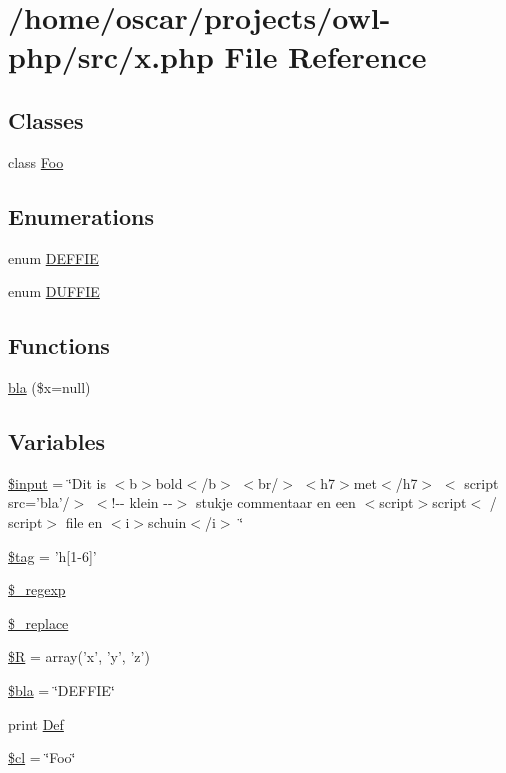 \section{/home/oscar/projects/owl-\/php/src/x.php File Reference}
\label{x_8php}
\subsection*{Classes}
\begin{DoxyCompactItemize}
\item 
class \hyperlink{classFoo}{Foo}
\end{DoxyCompactItemize}
\subsection*{Enumerations}
\begin{DoxyCompactItemize}
\item 
enum \hyperlink{x_8php_a22a59822f87564f3e66e3f14ac2c62f7}{DEFFIE} 
\item 
enum \hyperlink{x_8php_ad4f22af99a23392da6dce10ee148488d}{DUFFIE} 
\end{DoxyCompactItemize}
\subsection*{Functions}
\begin{DoxyCompactItemize}
\item 
\hyperlink{x_8php_ab6cdfa5a880b1653d91c3be35ccb5218}{bla} (\$x=null)
\end{DoxyCompactItemize}
\subsection*{Variables}
\begin{DoxyCompactItemize}
\item 
\hyperlink{x_8php_a69b271260be394b90709736cccb22c76}{\$input} = \char`\"{}Dit is $<$b$>$bold$<$/b$>$ $<$br/$>$ $<$h7$>$met$<$/h7$>$ $<$ script src='bla'/$>$ $<$!-\/-\/ klein -\/-\/$>$ stukje commentaar en een $<$script$>$script$<$ / script$>$ file en $<$i$>$schuin$<$/i$>$ \char`\"{}
\item 
\hyperlink{x_8php_a81d5015d41ed8ec66e9db8cdc5db9555}{\$tag} = 'h\mbox{[}1-\/6\mbox{]}'
\item 
\hyperlink{x_8php_aeb01ec713159369dbfafe73aabc23305}{\$\_\-regexp}
\item 
\hyperlink{x_8php_aeca86c76fb2260c4968ed2585230a067}{\$\_\-replace}
\item 
\hyperlink{x_8php_abe2d79bb4aa8b8243d81c67fdd50511f}{\$R} = array('x', 'y', 'z')
\item 
\hyperlink{x_8php_ac56f43e5df52bc5b57812bf5df15a8c2}{\$bla} = \char`\"{}DEFFIE\char`\"{}
\item 
print \hyperlink{x_8php_ab7ad2ab6d32f70132de3de13d200e0a3}{Def}
\item 
\hyperlink{x_8php_ac2cc45201ba208d03f81f848ef40fee9}{\$cl} = \char`\"{}Foo\char`\"{}
\end{DoxyCompactItemize}


